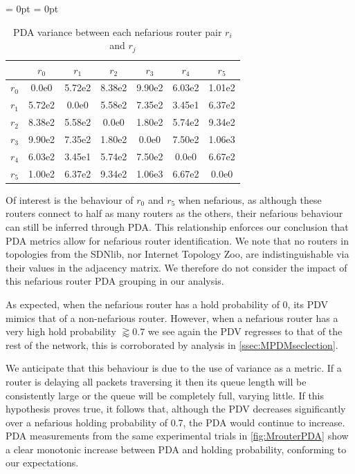 \begin{table}[t]
    \centering
    \aboverulesep = 0pt
    \belowrulesep = 0pt
    \begin{tabular}{l|S[table-format=1.2e1]S[table-format=1.2e1]S[table-format=1.2e1]S[table-format=1.2e1]S[table-format=1.2e1]S[table-format=1.2e1]}
        \toprule
        {} & {$r_0$} & {$r_1$} & {$r_2$} & {$r_3$} & {$r_4$} & {$r_5$} \\
        \midrule
        {$r_0$} & 0.0e0  & 5.72e2 & 8.38e2 & 9.90e2 & 6.03e2 & 1.01e2 \\
        {$r_1$} & 5.72e2 & 0.0e0  & 5.58e2 & 7.35e2 & 3.45e1 & 6.37e2 \\
        {$r_2$} & 8.38e2 & 5.58e2 & 0.0e0  & 1.80e2 & 5.74e2 & 9.34e2 \\
        {$r_3$} & 9.90e2 & 7.35e2 & 1.80e2 & 0.0e0  & 7.50e2 & 1.06e3 \\
        {$r_4$} & 6.03e2 & 3.45e1 & 5.74e2 & 7.50e2 & 0.0e0  & 6.67e2 \\
        {$r_5$} & 1.00e2 & 6.37e2 & 9.34e2 & 1.06e3 & 6.67e2 & 0.0e0  \\
        \bottomrule
    \end{tabular}
    \caption{PDA variance between each nefarious router pair $r_i$ and $r_j$}
    \label{tab:Rallvars}
\end{table}
Of interest is the behaviour of $r_0$ and $r_5$ when nefarious, as although these routers connect to half as many routers as the others, their nefarious behaviour can still be inferred through PDA. This relationship enforces our conclusion that PDA metrics allow for nefarious router identification. We note that no routers in topologies from the SDNlib, nor Internet Topology Zoo, are indistinguishable via their values in the adjacency matrix. We therefore do not consider the impact of this nefarious router PDA grouping in our analysis.\par
As expected, when the nefarious router has a hold probability of 0, its PDV mimics that of a non-nefarious router. However, when a nefarious router has a very high hold probability $\gtrapprox 0.7$ we see again the PDV regresses to that of the rest of the network, this is corroborated by analysis in \cref{ssec:MPDMseclection}.\par
We anticipate that this behaviour is due to the use of variance as a metric. If a router is delaying all packets traversing it then its queue length will be consistently large or the queue will be completely full, varying little. If this hypothesis proves true, it follows that, although the PDV decreases significantly over a nefarious holding probability of 0.7, the PDA would continue to increase. PDA measurements from the same experimental trials in \ref{fig:MrouterPDA} show a clear monotonic increase between PDA and holding probability, conforming to our expectations.\par

